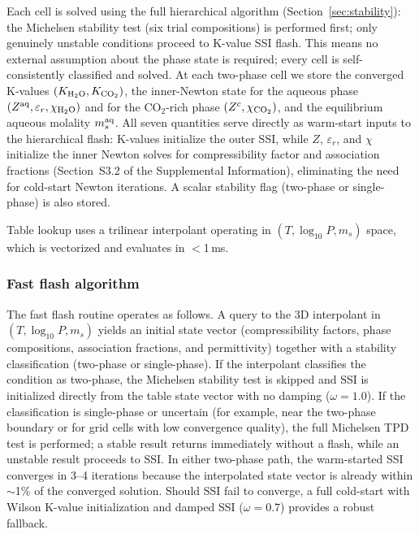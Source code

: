 \documentclass[preprint,12pt,number]{elsarticle}
\begin{document}
Each cell is solved using the full hierarchical algorithm
(Section~\ref{sec:stability}): the Michelsen stability test (six trial compositions)
is performed first; only genuinely unstable conditions proceed to K-value SSI flash.
This means no external assumption about the phase state is required; every cell is
self-consistently classified and solved.
At each two-phase cell we store the converged K-values $(K_{\rm H_2O}, K_{\rm CO_2})$, the
inner-Newton state for the aqueous phase $(Z^{\rm aq}, \varepsilon_r, \chi_{\rm H_2O})$
and for the CO$_2$-rich phase $(Z^c, \chi_{\rm CO_2})$, and the equilibrium
aqueous molality $m_s^{\rm aq}$.
All seven quantities serve directly as warm-start inputs to the hierarchical
flash: K-values initialize the outer SSI, while $Z$, $\varepsilon_r$, and
$\chi$ initialize the inner Newton solves for compressibility factor and
association fractions (Section~S3.2 of the Supplemental Information), eliminating the need for
cold-start Newton iterations.
A scalar stability flag (two-phase or single-phase) is also stored.

Table lookup uses a trilinear interpolant operating in $(T, \log_{10}P, m_s)$ space,
which is vectorized and evaluates in $<$1\,ms.

\subsubsection{Fast flash algorithm}
\label{sec:algorithm}

The fast flash routine operates as follows.
A query to the 3D interpolant in $(T, \log_{10}P, m_s)$ yields an initial state vector (compressibility factors, phase
compositions, association fractions, and permittivity) together with a stability classification
(two-phase or single-phase).
If the interpolant classifies the condition as two-phase, the Michelsen stability test is
skipped and SSI is initialized directly from the table state vector with no damping ($\omega = 1.0$).
If the classification is single-phase or uncertain (for example, near the two-phase boundary
or for grid cells with low convergence quality), the full Michelsen TPD test is performed;
a stable result returns immediately without a flash, while an unstable result proceeds to SSI.
In either two-phase path, the warm-started SSI converges in 3--4 iterations because the
interpolated state vector is already within $\sim$1\% of the converged solution.
Should SSI fail to converge, a full cold-start with Wilson K-value initialization and damped
SSI ($\omega = 0.7$) provides a robust fallback.
\end{document}
